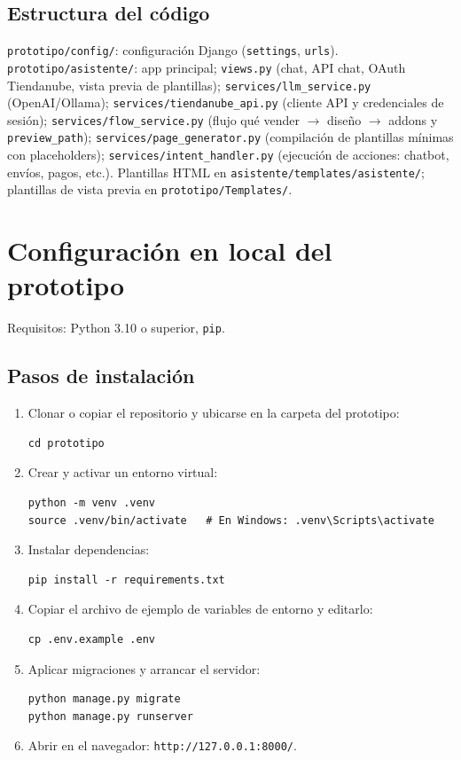 \documentclass[9pt,a4paper,twocolumn,twoside]{rho-class/rho}
\begin{document}
\subsection{Estructura del código}

\texttt{prototipo/config/}: configuración Django (\texttt{settings}, \texttt{urls}). \texttt{prototipo/asistente/}: app principal; \texttt{views.py} (chat, API chat, OAuth Tiendanube, vista previa de plantillas); \texttt{services/llm\_service.py} (OpenAI/Ollama); \texttt{services/tiendanube\_api.py} (cliente API y credenciales de sesión); \texttt{services/flow\_service.py} (flujo qué vender $\to$ diseño $\to$ addons y \texttt{preview\_path}); \texttt{services/page\_generator.py} (compilación de plantillas mínimas con placeholders); \texttt{services/intent\_handler.py} (ejecución de acciones: chatbot, envíos, pagos, etc.). Plantillas HTML en \texttt{asistente/templates/asistente/}; plantillas de vista previa en \texttt{prototipo/Templates/}.

\section{Configuración en local del prototipo}

Requisitos: Python 3.10 o superior, \texttt{pip}.

\subsection{Pasos de instalación}

\begin{enumerate}
    \item Clonar o copiar el repositorio y ubicarse en la carpeta del prototipo:
    \begin{verbatim}
cd prototipo
    \end{verbatim}
    \item Crear y activar un entorno virtual:
    \begin{verbatim}
python -m venv .venv
source .venv/bin/activate   # En Windows: .venv\Scripts\activate
    \end{verbatim}
    \item Instalar dependencias:
    \begin{verbatim}
pip install -r requirements.txt
    \end{verbatim}
    \item Copiar el archivo de ejemplo de variables de entorno y editarlo:
    \begin{verbatim}
cp .env.example .env
    \end{verbatim}
    \item Aplicar migraciones y arrancar el servidor:
    \begin{verbatim}
python manage.py migrate
python manage.py runserver
    \end{verbatim}
    \item Abrir en el navegador: \texttt{http://127.0.0.1:8000/}.
\end{enumerate}
\end{document}
